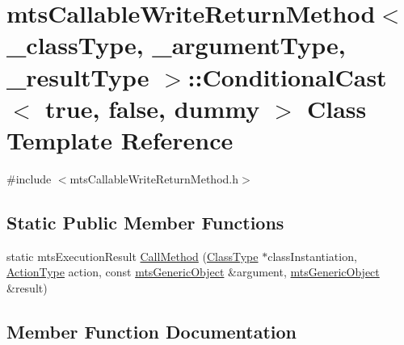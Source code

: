 \hypertarget{classmts_callable_write_return_method_1_1_conditional_cast_3_01true_00_01false_00_01dummy_01_4}{}\section{mts\+Callable\+Write\+Return\+Method$<$ \+\_\+class\+Type, \+\_\+argument\+Type, \+\_\+result\+Type $>$\+:\+:Conditional\+Cast$<$ true, false, dummy $>$ Class Template Reference}
\label{classmts_callable_write_return_method_1_1_conditional_cast_3_01true_00_01false_00_01dummy_01_4}


{\ttfamily \#include $<$mts\+Callable\+Write\+Return\+Method.\+h$>$}

\subsection*{Static Public Member Functions}
\begin{DoxyCompactItemize}
\item 
static mts\+Execution\+Result \hyperlink{classmts_callable_write_return_method_1_1_conditional_cast_3_01true_00_01false_00_01dummy_01_4_a983b6fc895950636c1d6c2f887d14d80}{Call\+Method} (\hyperlink{classmts_callable_write_return_method_a51dbe6298941ab172d83182c8188092d}{Class\+Type} $\ast$class\+Instantiation, \hyperlink{classmts_callable_write_return_method_a650562eae4db20a5cfbbff0f9f7e1a0a}{Action\+Type} action, const \hyperlink{classmts_generic_object}{mts\+Generic\+Object} \&argument, \hyperlink{classmts_generic_object}{mts\+Generic\+Object} \&result)
\end{DoxyCompactItemize}


\subsection{Member Function Documentation}
\hypertarget{classmts_callable_write_return_method_1_1_conditional_cast_3_01true_00_01false_00_01dummy_01_4_a983b6fc895950636c1d6c2f887d14d80}{}
